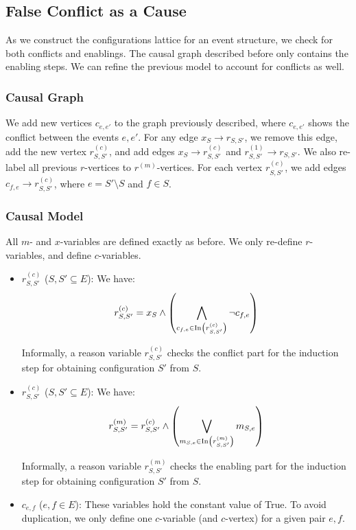 

\subsection{False Conflict as a Cause}

As we construct the configurations lattice for an event structure, we check for both
conflicts and enablings. The causal graph described before only contains the enabling
steps. We can refine the previous model to account for conflicts as well.

\subsubsection{Causal Graph}

We add new vertices $c_{e,e'}$ to the graph previously described, where
$c_{e,e'}$ shows the conflict between the events $e, e'$.
For any edge $x_S \rightarrow r_{S,S'}$, we remove this edge,
add the new vertex $r^{(c)}_{S,S'}$, and add edges $x_S \rightarrow r^{(c)}_{S,S'}$ and
$r^{(1)}_{S,S'} \rightarrow r_{S,S'}$. We also re-label all previous $r$-vertices to $r^{(m)}$-vertices.
For each vertex $r^{(c)}_{S,S'}$, we add edges $c_{f,e} \rightarrow r^{(c)}_{S,S'}$,
where $e = S' \setminus S$ and $f \in S$.

\subsubsection{Causal Model}

All $m$- and $x$-variables are defined exactly as before.
We only re-define $r$-variables, and define $c$-variables.

\begin{itemize}
  \item $r^{(c)}_{S,S'}$ ($S,S' \subseteq E$): We have:
  \[ r^{(c)}_{S,S'} = x_S \wedge
    \left( \bigwedge_{ c_{f,e} \in \text{In} \left(  r^{(c)}_{S,S'}  \right) } \neg c_{f,e} \right) \]
  
  Informally, a reason variable $r^{(c)}_{S,S'}$ checks the conflict part for
  the induction step for obtaining configuration $S'$ from $S$.
  \item $r^{(c)}_{S,S'}$ ($S,S' \subseteq E$): We have:
  \[ r^{(m)}_{S,S'} = r^{(c)}_{S,S'} \wedge
    \left( \bigvee_{ m_{S,e} \in \text{In} \left(  r^{(m)}_{S,S'}  \right) } m_{S,e} \right) \]
  
  Informally, a reason variable $r^{(m)}_{S,S'}$ checks the enabling part for
  the induction step for obtaining configuration $S'$ from $S$.
  \item $c_{e,f}$ ($e,f \in E$): These variables hold the constant value of True.
  To avoid duplication, we only define one $c$-variable (and $c$-vertex) for a given pair $e,f$.
\end{itemize}

